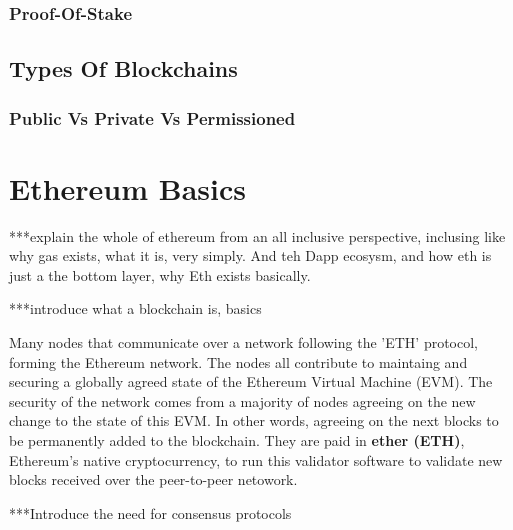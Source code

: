 
\subsubsection{Proof-Of-Stake}






\subsection{Types Of Blockchains}




\subsubsection{Public Vs Private Vs Permissioned}



\section{Ethereum Basics}

***explain the whole of ethereum from an all inclusive perspective, inclusing like why gas exists, what it is, very simply. And teh Dapp ecosysm, and how eth is just a the bottom layer, why Eth exists basically.

***introduce what a blockchain is, basics

Many nodes that communicate over a network following the 'ETH' protocol, forming the Ethereum network. The nodes all contribute to maintaing and securing a globally agreed state of the Ethereum Virtual Machine (EVM). The security of the network comes from a majority of nodes agreeing on the new change to the state of this EVM. In other words, agreeing on the next blocks to be permanently added to the blockchain. They are paid in \textbf{ether (ETH)}, Ethereum's native cryptocurrency, to run this validator software to validate new blocks received over the peer-to-peer netowork.

***Introduce the need for consensus protocols

